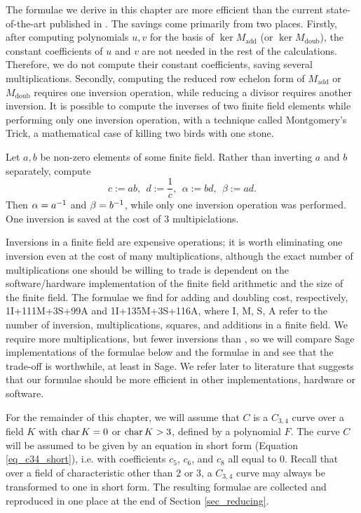 The formulae we derive in this chapter are more efficient than the current state-of-the-art published in \cite{kmakdisi18}.
The savings come primarily from two places.
Firstly, after computing polynomials $u,v$ for the basis of $\ker M_{\text{add}}$ (or $\ker M_{\text{doub}}$),
the constant coefficients of $u$ and $v$ are not needed in the rest of the calculations.
Therefore, we do not compute their constant coefficients, saving several multiplications.
Secondly, computing the reduced row echelon form of $M_{\text{add}}$ or $M_{\text{doub}}$ requires one inversion
operation, while reducing a divisor requires another inversion.
It is possible to compute the inverses of two finite field elements while performing only one inversion operation,
with a technique called Montgomery's Trick,
a mathematical case of killing two birds with one stone.
\begin{example}
  \label{ex_two_birds_one_stone}
  Let $a, b$ be non-zero elements of some finite field.
  Rather than inverting $a$ and $b$ separately, compute
  \[ c := ab, ~~ d := \frac 1 c, ~~ \alpha := bd, ~~ \beta := ad. \]
  Then $\alpha = a^{-1}$ and $\beta = b^{-1}$, while only one inversion operation was performed.
  One inversion is saved at the cost of 3 multipiclations.
\end{example}
Inversions in a finite field are expensive operations;
it is worth eliminating one inversion even at the cost of many multiplications,
although the exact number of multiplications one should be willing to trade is dependent on
the software/hardware implementation of the finite field arithmetic and the size of the finite field.
The formulae we find for adding and doubling cost, respectively, 1I+111M+3S+99A and 1I+135M+3S+116A,
where I, M, S, A refer to the number of inversion, multiplications, squares, and additions in a finite field.
We require more multiplications, but fewer inversions than \cite{kmakdisi18},
so we will compare Sage implementations of the formulae below and the formulae in \cite{kmakdisi18}
and see that the trade-off is worthwhile, at least in Sage.
We refer later to literature that suggests that our formulae should be more efficient in other implementations,
hardware or software.

For the remainder of this chapter, we will assume that $C$ is a $C_{3,4}$ curve
over a field $K$ with $\operatorname{char} K = 0$ or $\operatorname{char} K > 3$, defined by a polynomial $F$.
The curve $C$ will be assumed to be given by an equation in short form (Equation \ref{eq_c34_short}),
i.e. with coefficients $c_5$, $c_6$, and $c_8$ all equal to 0.
Recall that over a field of characteristic other than 2 or 3, a $C_{3,4}$ curve may always be transformed to one in short form.
The resulting formulae are collected and reproduced in one place at the end of Section \ref{sec_reducing}.



